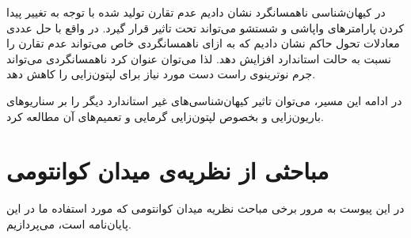 \documentclass[a4paper]{book}
\begin{document}
در کیهان‌شناسی ناهمسانگرد نشان دادیم عدم تقارن تولید شده با توجه به تغییر پیدا کردن پارامترهای واپاشی و شستشو می‌تواند تحت تاثیر قرار گیرد. در واقع با حل عددی معادلات تحول حاکم نشان دادیم که به ازای ناهمسانگردی خاص می‌تواند عدم تقارن را نسبت به حالت استاندارد افزایش دهد. لذا می‌توان عنوان کرد ناهمسانگردی می‌تواند جرم نوترینوی راست دست مورد نیاز برای لپتون‌زایی را کاهش دهد.

در ادامه این مسیر، می‌توان تاثیر کیهان‌شناسی‌های غیر استاندارد دیگر را بر سناریو‌های باریون‌زایی و بخصوص لپتون‌زایی گرمایی و تعمیم‌های آن مطالعه کرد.

\appendix
\chapter{مباحثی از نظریه‌ی میدان کوانتومی}
\label{appendix:QFT}
در این پیوست به مرور برخی مباحث نظریه میدان کوانتومی که مورد استفاده ما در این پایان‌نامه است، می‌پردازیم.
\end{document}
